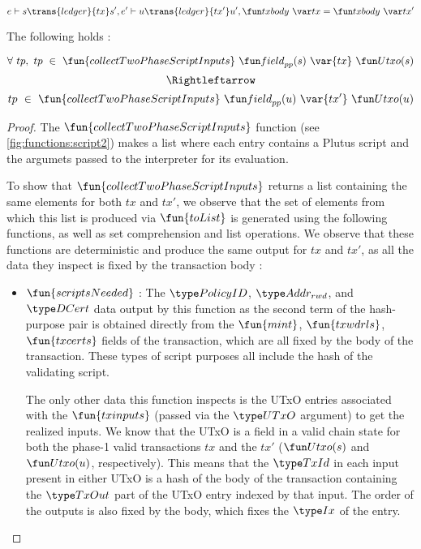 \begin{property}
\begin{lemma}
  \begin{equation*}
    e\vdash s\trans{ledger}{tx}s', \\
    e'\vdash u\trans{ledger}{tx'}u', \\
    \txbody{tx} = \txbody{tx'}
  \end{equation*}

  The following holds :

  \[\forall ~tp,~tp~\in~\fun{collectTwoPhaseScriptInputs} ~\field_{pp}(s)~\var{tx}~ \Utxo(s)\]
  \[ \Rightleftarrow \]
  \[tp~\in~\fun{collectTwoPhaseScriptInputs} ~\field_{pp}(u)~\var{tx'}~ \Utxo(u)\]

\end{lemma}
\begin{proof}

    The $\fun{collectTwoPhaseScriptInputs}$
    function (see \ref{fig:functions:script2})
    makes a list where each entry contains a Plutus script
    and the argumets passed to the interpreter for its evaluation.

    To show that $\fun{collectTwoPhaseScriptInputs}$ returns a list containing
    the same elements for both $tx$ and $tx'$,
    we observe that
    the set of elements from which this list is produced via $\fun{toList}$
    is generated using the following functions, as well as set comprehension
    and list operations. We observe that these functions are deterministic
    and produce the same output for $tx$ and $tx'$, as all the data they
    inspect is fixed by the transaction body :

    \begin{itemize}
      \item $\fun{scriptsNeeded}$ : The $\PolicyID$, $\AddrRWD$, and $\DCert$ data
      output by this function as the second term of the hash-purpose pair
      is obtained directly from the $\fun{mint}$, $\fun{txwdrls}$,
      $\fun{txcerts}$ fields of the transaction, which are all fixed by the
      body of the transaction. These types of script purposes all include
      the hash of the validating script.

      The only other data this function inspects is the UTxO entries associated
      with the $\fun{txinputs}$ (passed via the $\UTxO$ argument) to get the realized inputs.
      We know that the UTxO is a field in a valid chain state for both the phase-1 valid
      transactions $tx$ and
      the $tx'$ ($\Utxo(s)$ and $\Utxo(u)$, respectively). This means that the $\TxId$
      in each input present in either UTxO is a hash of the body of the transaction
      containing the $\TxOut$ part of the UTxO entry indexed by that input. The
      order of the outputs is also fixed by the body, which fixes the $\Ix$ of
      the entry.


\end{itemize}
\end{proof}
\end{property}

